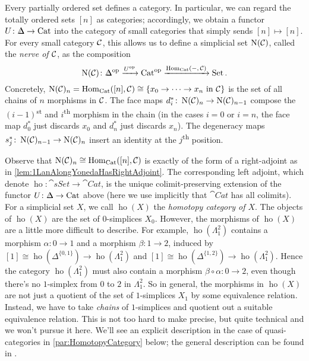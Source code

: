 \begin{numpar}\label{par:Nerve}
	Every partially ordered set defines a category. In particular, we can regard the totally ordered sets $[n]$ as categories; accordingly, we obtain a functor $U\colon \IDelta\rightarrow \cat{Cat}$ into the category of small categories that simply sends $[n]\mapsto [n]$. For every small category $\mathcal{C}$, this allows us to define a simplicial set $\operatorname{N}(\mathcal{C})$, called the \emph{nerve of $\mathcal{C}$}, as the composition
	\begin{equation*}
		\N(\Cc)\colon \IDelta^\op\xrightarrow{U^\op}\cat{Cat}^\op\xrightarrow{\Hom_{\cat{Cat}}(-,\,\Cc)}\cat{Set}\,.
	\end{equation*}
	Concretely, $\operatorname{N}(\mathcal{C})_n= \operatorname{Hom}_{\mathrm{Cat}}([n],\mathcal{C})\cong \left\{x_0\rightarrow \dotsb\rightarrow x_n\text{ in $\mathcal{C}$}\right\}$ is the set of all chains of $n$ morphisms in $\mathcal{C}$. The face maps $d_i^*\colon \operatorname{N}(\mathcal{C})_n\rightarrow \operatorname{N}(\mathcal{C})_{n-1}$ compose the $(i-1)$\textsuperscript{st} and $i$\textsuperscript{th} morphism in the chain (in the cases $i=0$ or $i=n$, the face map $d_0^*$ just discards $x_0$ and $d_n^*$ just discards $x_n$). The degeneracy maps $s_j^*\colon \operatorname{N}(\mathcal{C})_{n-1}\rightarrow \operatorname{N}(\mathcal{C})_n$ insert an identity at the $j$\textsuperscript{th} position.
	
	Observe that $\operatorname{N}(\mathcal{C})_n\cong\operatorname{Hom}_{\mathrm{Cat}}([n],\mathcal{C})$ is exactly of the form of a right-adjoint as in \cref{lem:1LanAlongYonedaHasRightAdjoint}. The corresponding left adjoint, which denote $\operatorname{ho}\colon \cat{sSet}\rightarrow\cat{Cat}$, is the unique colimit-preserving extension of the functor $U\colon\IDelta\rightarrow \cat{Cat}$ above (here we use implicitly that $\cat{Cat}$ has all colimits). For a simplicial set $X$, we call $\operatorname{ho}(X)$ the \emph{homotopy category of $X$}. The objects of $\operatorname{ho}(X)$ are the set of $0$-simplices $X_0$. However, the morphisms of $\operatorname{ho}(X)$ are a little more difficult to describe. For example, $\operatorname{ho}(\Lambda_1^2)$ contains a morphism $\alpha\colon 0\rightarrow 1$ and a morphism $\beta\colon 1\rightarrow 2$, induced by $[1]\cong \operatorname{ho}(\Delta^{\{0,1\}})\rightarrow \operatorname{ho}(\Lambda_1^2)$ and $[1]\cong \operatorname{ho}(\Delta^{\{1,2\}})\rightarrow \operatorname{ho}(\Lambda_1^2)$. Hence the category $\operatorname{ho}(\Lambda_1^2)$ must also contain a morphism $\beta\circ\alpha\colon 0\rightarrow 2$, even though there's no $1$-simplex from $0$ to $2$ in $\Lambda_1^2$. So in general, the morphisms in $\operatorname{ho}(X)$ are not just a quotient of the set of $1$-simplices $X_1$ by some equivalence relation. Instead, we have to take \emph{chains} of $1$-simplices and quotient out a suitable equivalence relation. This is not too hard to make precise, but quite technical and we won't pursue it here. We'll see an explicit description in the case of quasi-categories in \cref{par:HomotopyCategory} below; the general description can be found in \cite[Construction/Proposition~II.24]{HigherCatsI}.
\end{numpar}
